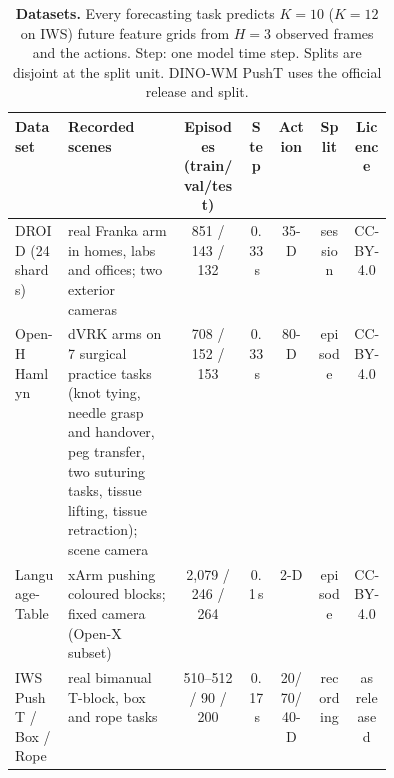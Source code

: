 \begin{table}[!htbp]
\centering\scriptsize
\caption{\textbf{Datasets.} Every forecasting task predicts $K{=}10$ ($K{=}12$ on IWS) future feature grids from $H{=}3$ observed frames and
the actions. Step: one model time step. Splits are disjoint at the split unit. DINO-WM PushT uses the official release
and split.}
\label{tab:datasets}
\setlength{\tabcolsep}{2.5pt}
\begin{tabular}{@{}p{0.14\linewidth}p{0.305\linewidth}ccccc@{}}
\toprule
Dataset & Recorded scenes & Episodes (train/val/test) & Step & Action & Split & Licence \\
\midrule
DROID (24 shards) & real Franka arm in homes, labs and offices; two exterior cameras & 851 / 143 / 132 & 0.33\,s & 35-D & session & CC-BY-4.0 \\
Open-H Hamlyn & dVRK arms on 7 surgical practice tasks (knot tying, needle grasp and handover, peg transfer, two suturing tasks, tissue lifting, tissue retraction); scene camera & 708 / 152 / 153 & 0.33\,s & 80-D & episode & CC-BY-4.0 \\
Language-Table & xArm pushing coloured blocks; fixed camera (Open-X subset) & 2{,}079 / 246 / 264 & 0.1\,s & 2-D & episode & CC-BY-4.0 \\
IWS PushT / Box / Rope & real bimanual T-block, box and rope tasks \citep{wang2026iws} & 510--512 / 90 / 200 & 0.17\,s & 20/70/40-D & recording & as released \\
\bottomrule
\end{tabular}
\end{table}
